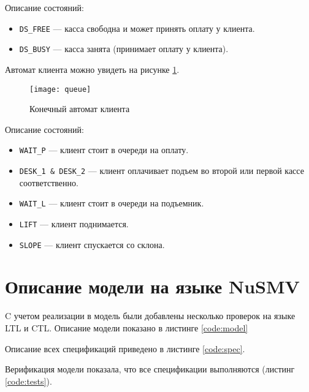 Описание состояний:
\begin{itemize}
\item \texttt{DS\_FREE} --- касса свободна и может принять оплату у клиента.
\item \texttt{DS\_BUSY} --- касса занята (принимает оплату у клиента).
\end{itemize}

Автомат клиента можно увидеть на рисунке \ref{pic:queue}.
\begin{figure}[H]
	\begin{center}
		\texttt{[image: queue]}
		\caption{Конечный автомат клиента} 
		\label{pic:queue} %
	\end{center}
\end{figure}

Описание состояний:
\begin{itemize}
\item \texttt{WAIT\_P} --- клиент стоит в очереди на оплату.
\item \texttt{DESK\_1 \& DESK\_2} --- клиент оплачивает подъем во второй или первой кассе соответственно.
\item \texttt{WAIT\_L} --- клиент стоит в очереди на подъемник.
\item \texttt{LIFT} --- клиент поднимается.
\item \texttt{SLOPE} --- клиент спускается со склона.
\end{itemize}

\section{Описание модели на языке NuSMV}
C учетом реализации в модель были добавлены несколько проверок на языке LTL и CTL. Описание модели показано в листинге \ref{code:model}


\parindent=1cm


Описание всех спецификаций приведено в листинге \ref{code:spec}.



\parindent=1cm

Верификация модели показала, что все спецификации выполняются (листинг \ref{code:tests}).


\parindent=1cm

